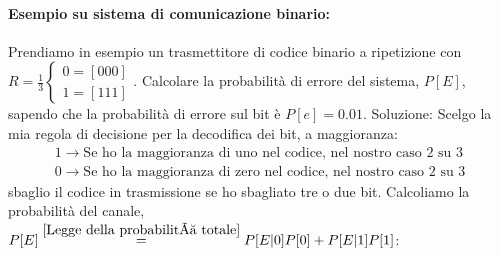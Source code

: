             \paragraph{Esempio su sistema di comunicazione binario:}
                Prendiamo in esempio un trasmettitore di codice binario a ripetizione con $R = \frac{1}{3}
                \begin{cases}
                    0 = [000]\nonumber \\
                    1 = [111]\nonumber    
                \end{cases}$. Calcolare la probabilità di errore del sistema, $P[E]$, sapendo che la probabilità di errore sul
                bit è $P[e] = 0.01$.
                Soluzione:
                Scelgo la mia regola di decisione per la decodifica dei bit, a maggioranza:
                \begin{gather}
                    1 \rightarrow \text{Se ho la maggioranza di uno nel codice, nel nostro caso 2 su 3} \nonumber \\
                    0 \rightarrow \text{Se ho la maggioranza di zero nel codice, nel nostro caso 2 su 3} \nonumber
                \end{gather}
                sbaglio il codice in trasmissione se ho sbagliato tre o due bit. Calcoliamo la probabilità del canale,
                $P[E] \overset{\ref{Legge della probabilità totale}}{=} P[E|0]P[0] + P[E|1]P[1]$:
